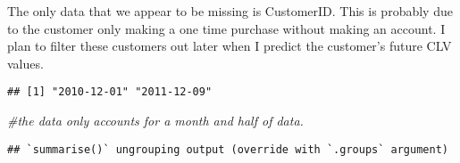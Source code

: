 \documentclass[]{article}
\newenvironment{Shaded}{\begin{snugshade}}{\end{snugshade}}
\newcommand{\CommentTok}[1]{\textcolor[rgb]{0.56,0.35,0.01}{\textit{#1}}}
\newcommand{\DataTypeTok}[1]{\textcolor[rgb]{0.13,0.29,0.53}{#1}}
\newcommand{\KeywordTok}[1]{\textcolor[rgb]{0.13,0.29,0.53}{\textbf{#1}}}
\newcommand{\NormalTok}[1]{#1}
\newcommand{\OperatorTok}[1]{\textcolor[rgb]{0.81,0.36,0.00}{\textbf{#1}}}
\newcommand{\StringTok}[1]{\textcolor[rgb]{0.31,0.60,0.02}{#1}}
\begin{document}
The only data that we appear to be missing is CustomerID. This is
probably due to the customer only making a one time purchase without
making an account. I plan to filter these customers out later when I
predict the customer's future CLV values.

\begin{Shaded}
\end{Shaded}

\begin{verbatim}
## [1] "2010-12-01" "2011-12-09"
\end{verbatim}

\begin{Shaded}
\begin{Highlighting}[]
\CommentTok{#the data only accounts for a month and half of data.}
\end{Highlighting}
\end{Shaded}

\begin{Shaded}
\end{Shaded}

\begin{verbatim}
## `summarise()` ungrouping output (override with `.groups` argument)
\end{verbatim}

\begin{Shaded}
\end{Shaded}
\end{document}
